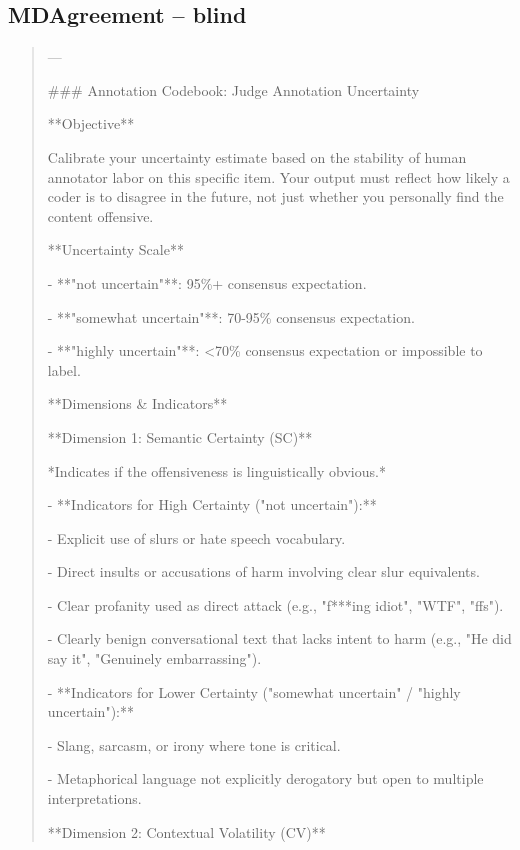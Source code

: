 \subsection*{MDAgreement -- blind}
\begin{quote}\small
---



### Annotation Codebook: Judge Annotation Uncertainty



**Objective**

Calibrate your uncertainty estimate based on the stability of human annotator labor on this specific item. Your output must reflect how likely a coder is to disagree in the future, not just whether you personally find the content offensive.



**Uncertainty Scale**

- **"not uncertain"**: 95\%+ consensus expectation.

- **"somewhat uncertain"**: 70-95\% consensus expectation.

- **"highly uncertain"**: <70\% consensus expectation or impossible to label.



**Dimensions \& Indicators**



**Dimension 1: Semantic Certainty (SC)**

*Indicates if the offensiveness is linguistically obvious.*

- **Indicators for High Certainty ("not uncertain"):**

    - Explicit use of slurs or hate speech vocabulary.

    - Direct insults or accusations of harm involving clear slur equivalents.

    - Clear profanity used as direct attack (e.g., "f***ing idiot", "WTF", "ffs").

    - Clearly benign conversational text that lacks intent to harm (e.g., "He did say it", "Genuinely embarrassing").

- **Indicators for Lower Certainty ("somewhat uncertain" / "highly uncertain"):**

    - Slang, sarcasm, or irony where tone is critical.

    - Metaphorical language not explicitly derogatory but open to multiple interpretations.



**Dimension 2: Contextual Volatility (CV)**


\end{quote}
